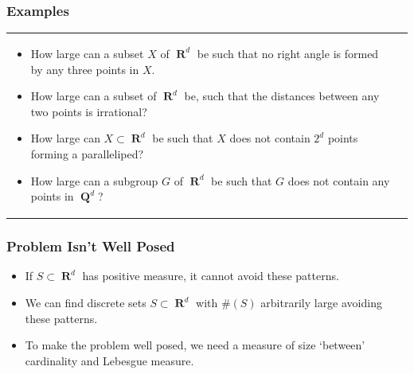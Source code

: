 \documentclass[usenames,dvipsnames,handout]{beamer}
\DeclareMathOperator{\RR}{\textbf{R}}
\DeclareMathOperator{\QQ}{\textbf{Q}}
\begin{document}
\begin{frame}
  \frametitle{Examples}

\begin{tabular}{p{}p{}}

\begin{itemize}
    \pause
    \item How large can a subset $X$ of $\RR^d$ be such that no right angle is formed by any three points in $X$.

    \pause
    \item How large can a subset of $\RR^d$ be, such that the distances between any two points is irrational?

    \pause
    \item How large can $X \subset \RR^d$ be such that $X$ does not contain $2^d$ points forming a paralleliped?

    \pause
    \item How large can a subgroup $G$ of $\RR^d$ be such that $G$ does not contain any points in $\QQ^d$?



\end{itemize}

\end{tabular}
\end{frame}





\begin{frame}
    \frametitle{Problem Isn't Well Posed}
    \pause

    \begin{itemize}
        \item If $S \subset \RR^d$ has positive measure, it cannot avoid these patterns.
        \item We can find discrete sets $S \subset \RR^d$ with $\#(S)$ arbitrarily large avoiding these patterns.
        \item To make the problem well posed, we need a measure of size `between' cardinality and Lebesgue measure.
    \end{itemize}
\end{frame}
\end{document}
